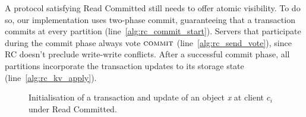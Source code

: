 A protocol satisfying Read Committed still needs to offer atomic visibility. To do so, our implementation uses two-phase commit, guaranteeing that a transaction commits at every partition (line~\ref{alg:rc_commit_start}). Servers that participate during the commit phase always vote $\text{\sc commit}$ (line~\ref{alg:rc_send_vote}), since RC doesn't preclude write-write conflicts. After a successful commit phase, all partitions incorporate the transaction updates to its storage state (line~\ref{alg:rc_kv_apply}).

\begin{figure}[h]
\begin{algorithm}[H]
  \setcounter{AlgoLine}{0}

  \smallskip

\end{algorithm}
\caption{Initialisation of a transaction and update of an object \emph{x} at client $c_i$ under Read Committed.}
\end{figure}

